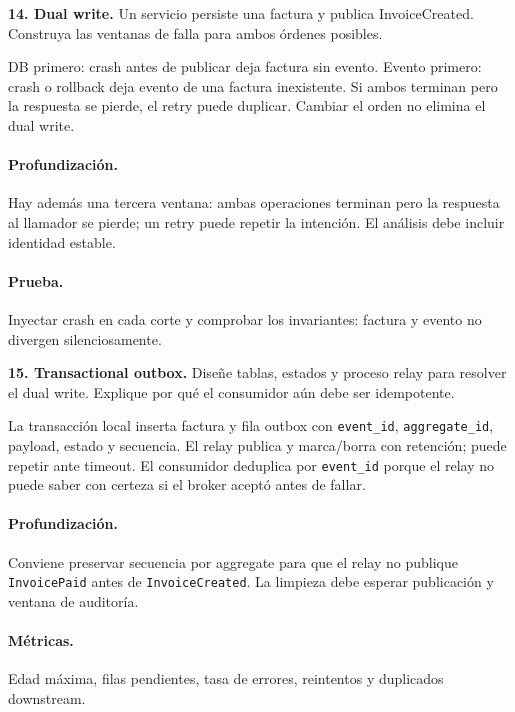 \documentclass[variant=guiaresuelta,cover=institutional,mode=screen]{ua-engineering-v6-article}
\begin{document}
\begin{uaexercise}
\textbf{14. Dual write.} Un servicio persiste una factura y publica InvoiceCreated. Construya las ventanas de falla para ambos órdenes posibles.
\end{uaexercise}
\begin{uaanswer}
DB primero: crash antes de publicar deja factura sin evento. Evento primero: crash o rollback deja evento de una factura inexistente. Si ambos terminan pero la respuesta se pierde, el retry puede duplicar. Cambiar el orden no elimina el dual write.

\paragraph{Profundización.} Hay además una tercera ventana: ambas operaciones terminan pero la respuesta al llamador se pierde; un retry puede repetir la intención. El análisis debe incluir identidad estable.\paragraph{Prueba.} Inyectar crash en cada corte y comprobar los invariantes: factura y evento no divergen silenciosamente.
\end{uaanswer}
\begin{uaexercise}
\textbf{15. Transactional outbox.} Diseñe tablas, estados y proceso relay para resolver el dual write. Explique por qué el consumidor aún debe ser idempotente.
\end{uaexercise}
\begin{uaanswer}
La transacción local inserta factura y fila outbox con \texttt{event\_id}, \texttt{aggregate\_id}, payload, estado y secuencia. El relay publica y marca/borra con retención; puede repetir ante timeout. El consumidor deduplica por \texttt{event\_id} porque el relay no puede saber con certeza si el broker aceptó antes de fallar.

\paragraph{Profundización.} Conviene preservar secuencia por aggregate para que el relay no publique \texttt{InvoicePaid} antes de \texttt{InvoiceCreated}. La limpieza debe esperar publicación y ventana de auditoría.\paragraph{Métricas.} Edad máxima, filas pendientes, tasa de errores, reintentos y duplicados downstream.
\end{uaanswer}
\end{document}
